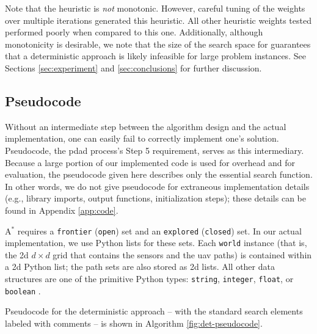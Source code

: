 \documentclass[../main.tex]{subfiles}
\begin{document}
Note that the heuristic is \textit{not} monotonic. However, careful tuning of the weights over multiple iterations generated this heuristic. All other heuristic weights tested performed poorly when compared to this one. Additionally, although monotonicity is desirable, we note that the size of the search space for \probs guarantees that a deterministic approach is likely infeasible for large problem instances. See Sections \ref{sec:experiment} and \ref{sec:conclusions} for further discussion.

\subsection{Pseudocode}\label{det:pseudocode}

Without an intermediate step between the algorithm design and the actual implementation, one can easily fail to correctly implement one's solution. Pseudocode, the \ac{pdad} process's Step 5 requirement, serves as this intermediary. Because a large portion of our implemented code is used for overhead and for evaluation, the pseudocode given here describes only the essential search function. In other words, we do not give pseudocode for extraneous implementation details (e.g., library imports, output functions, initialization steps); these details can be found in Appendix \ref{app:code}. 

A$^*$ requires a \texttt{frontier} (\texttt{open}) set and an \texttt{explored} (\texttt{closed}) set. In our actual implementation, we use Python lists for these sets. Each \texttt{world} instance (that is, the \ac{2d} $d\times d$ grid that contains the sensors and the \ac{uav} paths) is contained within a \ac{2d} Python list; the path sets are also stored as \ac{2d} lists. All other data structures are one of the primitive Python types: \texttt{string}, \texttt{integer}, \texttt{float}, or \texttt{boolean} \cite{python:primitives}.

Pseudocode for the deterministic approach -- with the standard search elements labeled with comments -- is shown in Algorithm \ref{fig:det-pseudocode}.
\end{document}

